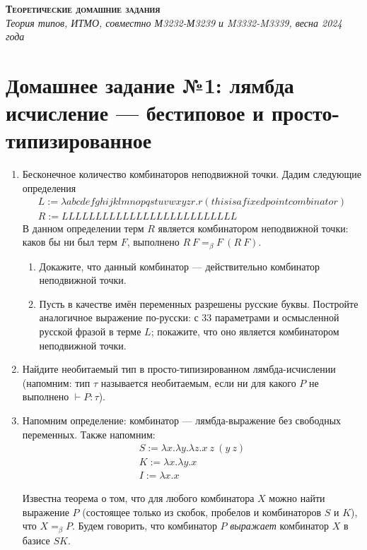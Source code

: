 \documentclass[10pt,a4paper,oneside]{article}
\begin{document}
\begin{center}{\Large\textsc{\textbf{Теоретические домашние задания}}}\\
             \it Теория типов, ИТМО, совместно М3232-М3239 и M3332-M3339, весна 2024 года\end{center}

\section*{Домашнее задание №1: лямбда исчисление --- бестиповое и просто-типизированное}

\begin{enumerate}
\item Бесконечное количество комбинаторов неподвижной точки. Дадим следующие определения
$$\begin{array}{l}
L := \lambda abcdefghijklmnopqstuvwxyzr.r(thisisafixedpointcombinator)\\
R := LLLLLLLLLLLLLLLLLLLLLLLLLL\end{array}$$
В данном определении терм $R$ является комбинатором неподвижной точки: каков бы ни был терм
$F$, выполнено $R\ F =_\beta F\ (R\ F)$.
\begin{enumerate}
\item Докажите, что данный комбинатор --- действительно комбинатор неподвижной точки.
\item Пусть в качестве имён переменных разрешены русские буквы. Постройте аналогичное выражение
по-русски: с 33 параметрами и осмысленной русской фразой в терме $L$; покажите, что оно является
комбинатором неподвижной точки.
\end{enumerate}

\item Найдите необитаемый тип в просто-типизированном лямбда-исчислении (напомним: тип $\tau$ 
называется необитаемым, если ни для какого $P$ не выполнено $\vdash P : \tau$).

\item Напомним определение: комбинатор --- лямбда-выражение без свободных переменных. Также напомним:
$$\begin{array}{l}
S := \lambda x.\lambda y.\lambda z.x\ z\ (y\ z)\\
K := \lambda x.\lambda y.x\\
I := \lambda x.x
\end{array}$$

Известна теорема о том, что для любого комбинатора $X$ можно найти выражение $P$
(состоящее только из скобок, пробелов и комбинаторов $S$ и $K$), что $X =_\beta P$.
Будем говорить, что комбинатор $P$ \emph{выражает} комбинатор $X$ в базисе $SK$.


\end{enumerate}
\end{document}
